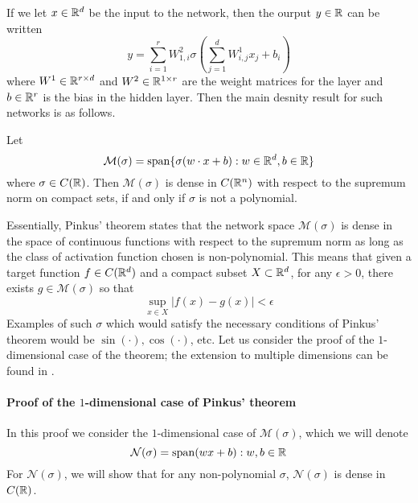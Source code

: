 If we let $x \in \mathbb{R}^d$ be the input to the network, then the ourput $y \in \mathbb{R}$ can be written
\begin{displaymath}
  y = \sum_{i=1}^r W_{1, i}^2 \sigma\left( \displaystyle\sum_{j=1}^{d}W_{i, j}^1 x_j + b_i\right)
\end{displaymath}
where $W^1 \in \mathbb{R}^{r \times d}$ and $W^2 \in \mathbb{R}^{1 \times r}$ are the weight matrices for the layer and $b \in \mathbb{R}^r$ is the bias in the hidden layer. Then the main desnity result for such networks is as follows. 
\begin{theorem}[Pinkus]
  Let
  \begin{displaymath}
    \mathcal{M}(\sigma) = \operatorname{span}\{ \sigma(w\cdot x + b): w \in \mathbb{R}^d, b \in \mathbb{R}\}
  \end{displaymath}
  where $\sigma \in C(\mathbb{R})$. Then $\mathcal{M}(\sigma)$ is dense in $C(\mathbb{R}^n)$ with respect to the supremum norm on compact sets, if and only if $\sigma$ is not a polynomial.
\end{theorem}
Essentially, Pinkus' theorem states that the network space $\mathcal{M}(\sigma)$ is dense in the space of continuous functions with respect to the supremum norm as long as the class of activation function chosen is non-polynomial. This means that given a target function $f \in C(\mathbb{R}^d)$ and a compact subset $X \subset \mathbb{R}^d$, for any $\epsilon > 0$, there exists $g \in \mathcal{M}(\sigma)$ so that 
\[ \sup_{x \in X} | f(x) - g(x) | < \epsilon \]
Examples of such $\sigma$ which would satisfy the necessary conditions of Pinkus' theorem would be $\sin(\cdot), \cos(\cdot)$, etc. Let us consider the proof of the $1$-dimensional case of the theorem; the extension to multiple dimensions can be found in \cite{surv}.

\paragraph{Proof of the $1$-dimensional case of Pinkus' theorem} In this proof we consider the $1$-dimensional case of $\mathcal{M}(\sigma)$, which we will denote
\[ \mathcal{N}(\sigma) = \operatorname{span}(wx+b): w, b \in \mathbb{R} \]
For $\mathcal{N}(\sigma)$, we will show that for any non-polynomial $\sigma$, $\mathcal{N}(\sigma)$ is dense in $C(\mathbb{R})$.
